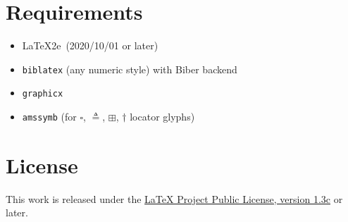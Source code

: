 \documentclass[11pt, a4paper]{article}
\newcommand{\pkg}[1]{\texttt{#1}}
\begin{document}
\section{Requirements}

\begin{itemize}[leftmargin=2em]
  \item \LaTeX2e\ (2020/10/01 or later)
  \item \pkg{biblatex} (any numeric style) with Biber backend
  \item \pkg{graphicx}
  \item \pkg{amssymb} (for $\square$, $\triangleq$, $\boxplus$, $\dagger$ locator glyphs)
\end{itemize}

\section{License}

This work is released under the \href{https://www.latex-project.org/lppl/lppl-1-3c/}{LaTeX Project Public License, version 1.3c} or later.


\printbibliography
\end{document}
